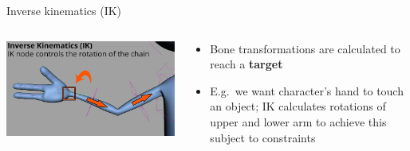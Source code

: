 \begin{frame}{Inverse kinematics (IK)}
	\begin{columns}
		\begin{column}{0.4\textwidth}
			\includegraphics[width=\textwidth]{inverse_kinematics}
		\end{column}
		\begin{column}{0.58\textwidth}
			\begin{itemize}
				\pause\item Bone transformations are calculated to reach a \textbf{target}
				\pause\item E.g.\ we want character's hand to touch an object; IK calculates rotations of upper and lower arm to achieve this
					subject to constraints
			\end{itemize}
		\end{column}
	\end{columns}
\end{frame}

